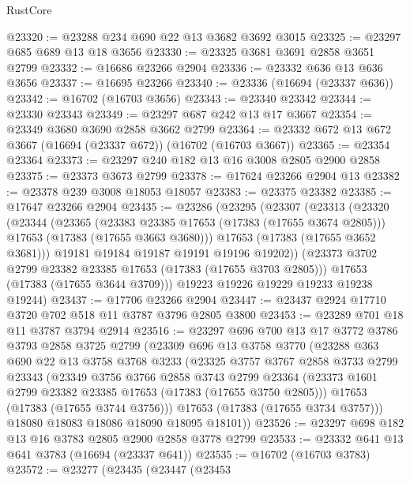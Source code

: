 \begin{lexlean}{RustCore}
\begin{coremodule}
@23320 := @23288 @234 @690 @22 @13 @3682 @3692 @3015
@23325 := @23297 @685 @689 @13 @18 @3656
@23330 := @23325 @3681 @3691 @2858 @3651 @2799
@23332 := @16686 @23266 @2904
@23336 := @23332 @636 @13 @636 @3656
@23337 := @16695 @23266
@23340 := @23336 (@16694 (@23337 @636))
@23342 := @16702 (@16703 @3656)
@23343 := @23340 @23342
@23344 := @23330 @23343
@23349 := @23297 @687 @242 @13 @17 @3667
@23354 := @23349 @3680 @3690 @2858 @3662 @2799
@23364 := @23332 @672 @13 @672 @3667 (@16694 (@23337 @672)) (@16702 (@16703 @3667))
@23365 := @23354 @23364
@23373 := @23297 @240 @182 @13 @16 @3008 @2805 @2900 @2858
@23375 := @23373 @3673 @2799
@23378 := @17624 @23266 @2904 @13
@23382 := @23378 @239 @3008 @18053 @18057
@23383 := @23375 @23382
@23385 := @17647 @23266 @2904
@23435 := @23286
    (@23295
      (@23307
        (@23313
          (@23320
            (@23344
              (@23365
                (@23383 @23385 @17653 (@17383 (@17655 @3674 @2805)))
                @17653
                (@17383 (@17655 @3663 @3680)))
              @17653
              (@17383 (@17655 @3652 @3681)))
            @19181
            @19184
            @19187
            @19191
            @19196
            @19202))
        (@23373 @3702 @2799 @23382 @23385 @17653 (@17383 (@17655 @3703 @2805)))
        @17653
        (@17383 (@17655 @3644 @3709)))
      @19223
      @19226
      @19229
      @19233
      @19238
      @19244)
@23437 := @17706 @23266 @2904
@23447 := @23437 @2924 @17710 @3720 @702 @518 @11 @3787 @3796 @2805 @3800
@23453 := @23289 @701 @18 @11 @3787 @3794 @2914
@23516 := @23297
    @696
    @700
    @13
    @17
    @3772
    @3786
    @3793
    @2858
    @3725
    @2799
    (@23309
      @696
      @13
      @3758
      @3770
      (@23288
        @363
        @690
        @22
        @13
        @3758
        @3768
        @3233
        (@23325
          @3757
          @3767
          @2858
          @3733
          @2799
          @23343
          (@23349
            @3756
            @3766
            @2858
            @3743
            @2799
            @23364
            (@23373 @1601 @2799 @23382 @23385 @17653 (@17383 (@17655 @3750 @2805)))
            @17653
            (@17383 (@17655 @3744 @3756)))
          @17653
          (@17383 (@17655 @3734 @3757)))
        @18080
        @18083
        @18086
        @18090
        @18095
        @18101))
@23526 := @23297 @698 @182 @13 @16 @3783 @2805 @2900 @2858 @3778 @2799
@23533 := @23332 @641 @13 @641 @3783 (@16694 (@23337 @641))
@23535 := @16702 (@16703 @3783)
@23572 := @23277
    (@23435
      (@23447
        (@23453

\end{coremodule}
\end{lexlean}
